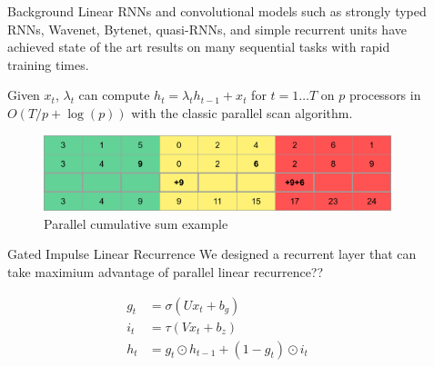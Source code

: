 \documentclass[final]{beamer}
\newlength{\sepwid}
\newlength{\onecolwid}
\newlength{\twocolwid}
\begin{document}
\begin{frame}[t]
\begin{columns}[t]
\begin{column}{\onecolwid}
\begin{block}{Background}
Linear RNNs and convolutional models such as strongly typed RNNs, Wavenet, Bytenet,
quasi-RNNs, and simple recurrent units
have achieved state of the art results on many sequential tasks with rapid training times.

Given $x_t$, $\lambda_t$ can compute $h_t=\lambda_t h_{t-1} + x_t$ for $t=1\ldots T$ on $p$
processors in $O(T/p + \log(p))$ with the classic parallel scan algorithm.
\end{block}


\begin{figure}
\includegraphics[width=1.0\linewidth]{cumsum.png}
\caption{Parallel cumulative sum example}
\end{figure}


\begin{block}{Gated Impulse Linear Recurrence}
We designed a recurrent layer that can take maximium advantage of parallel linear recurrence??

\begin{align*}
g_t &= \sigma(Ux_t + b_g) \\
i_t &= \tau(Vx_t + b_z) \\
h_t &= g_t \odot h_{t-1} + (1-g_t)\odot i_t
\end{align*}
\end{block}


\end{column} %

\begin{column}{\sepwid}\end{column} %

\begin{column}{\twocolwid} %

\begin{columns}[t,totalwidth=\twocolwid] %


\end{columns}
\end{column}
\end{columns}
\end{frame}
\end{document}
